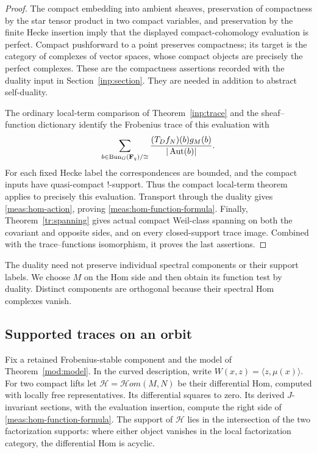 \begin{proof}
The compact embedding into ambient sheaves, preservation of compactness
by the star tensor product in two compact variables, and preservation by
the finite Hecke insertion imply that the displayed compact-cohomology
evaluation is perfect.  Compact pushforward to a point preserves
compactness; its target is the category of complexes of vector spaces,
whose compact objects are precisely the perfect complexes.  These are the
compactness assertions recorded with the duality input in
Section~\ref{inp:section}.  They are needed in addition to abstract
self-duality.

The ordinary local-term comparison of Theorem~\ref{inp:trace} and the
sheaf--function dictionary
identify the Frobenius trace of this evaluation with
\[
 \sum_{b\in\operatorname{Bun}_G(\mathbf F_q)/\cong}
       \frac{(T_Df_N)(b)g_M(b)}{|\operatorname{Aut}(b)|}.
\]
For each fixed Hecke label the correspondences are bounded, and the compact
inputs have quasi-compact $!$-support.  Thus the compact local-term theorem
applies to precisely this evaluation.  Transport through the duality gives
\eqref{meas:hom-action}, proving
\eqref{meas:hom-function-formula}.  Finally, Theorem~\ref{tr:spanning}
gives actual compact Weil-class spanning on both the covariant and opposite
sides, and on every closed-support trace image.  Combined with the
trace--functions isomorphism, it proves the last assertions.
\end{proof}

The duality need not preserve individual spectral components or their
support labels.  We choose $M$ on the Hom side and then obtain its function
test by duality.  Distinct components are orthogonal because their spectral
Hom complexes vanish.

\subsection{Supported traces on an orbit}

Fix a retained Frobenius-stable component and the model of
Theorem~\ref{mod:model}.  In the curved description, write
$W(x,z)=\langle z,\mu(x)\rangle$.  For two compact lifts let
$\mathcal H=\mathcal H\!om(M,N)$ be their differential Hom, computed with
locally free representatives.  Its differential squares to zero.
Its derived $J$-invariant sections, with the evaluation insertion, compute
the right side of \eqref{meas:hom-function-formula}.  The support of
$\mathcal H$ lies in the intersection of the two factorization supports:
where either object vanishes in the local factorization category, the
differential Hom is acyclic.

